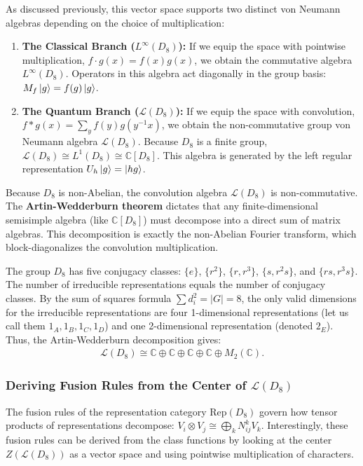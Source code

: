 \documentclass[11pt]{article}
\begin{document}
As discussed previously, this vector space supports two distinct von Neumann algebras depending on the choice of multiplication:
\begin{enumerate}
    \item \textbf{The Classical Branch ($L^\infty(D_8)$):} If we equip the space with pointwise multiplication, $f \cdot g(x) = f(x)g(x)$, we obtain the commutative algebra $L^\infty(D_8)$. Operators in this algebra act diagonally in the group basis: $M_f \ket{g} = f(g)\ket{g}$.
    \item \textbf{The Quantum Branch ($\mathcal{L}(D_8)$):} If we equip the space with convolution, $f * g(x) = \sum_{y} f(y)g(y^{-1}x)$, we obtain the non-commutative group von Neumann algebra $\mathcal{L}(D_8)$. Because $D_8$ is a finite group, $\mathcal{L}(D_8) \cong L^1(D_8) \cong \mathbb{C}[D_8]$. This algebra is generated by the left regular representation $U_h \ket{g} = \ket{hg}$.
\end{enumerate}

Because $D_8$ is non-Abelian, the convolution algebra $\mathcal{L}(D_8)$ is non-commutative. The \textbf{Artin-Wedderburn theorem} dictates that any finite-dimensional semisimple algebra (like $\mathbb{C}[D_8]$) must decompose into a direct sum of matrix algebras. This decomposition is exactly the non-Abelian Fourier transform, which block-diagonalizes the convolution multiplication.

The group $D_8$ has five conjugacy classes: $\{e\}$, $\{r^2\}$, $\{r, r^3\}$, $\{s, r^2s\}$, and $\{rs, r^3s\}$. The number of irreducible representations equals the number of conjugacy classes. By the sum of squares formula $\sum d_i^2 = |G| = 8$, the only valid dimensions for the irreducible representations are four 1-dimensional representations (let us call them $1_A, 1_B, 1_C, 1_D$) and one 2-dimensional representation (denoted $2_E$). Thus, the Artin-Wedderburn decomposition gives:
\begin{align}
    \mathcal{L}(D_8) \cong \mathbb{C} \oplus \mathbb{C} \oplus \mathbb{C} \oplus \mathbb{C} \oplus M_2(\mathbb{C}).
\end{align}

\subsubsection*{Deriving Fusion Rules from the Center of $\mathcal{L}(D_8)$}

The fusion rules of the representation category $\mathrm{Rep}(D_8)$ govern how tensor products of representations decompose: $V_i \otimes V_j \cong \bigoplus_k N_{ij}^k V_k$. Interestingly, these fusion rules can be derived from the class functions by looking at the center $Z(\mathcal{L}(D_8))$ as a vector space and using pointwise multiplication of characters.
\end{document}
